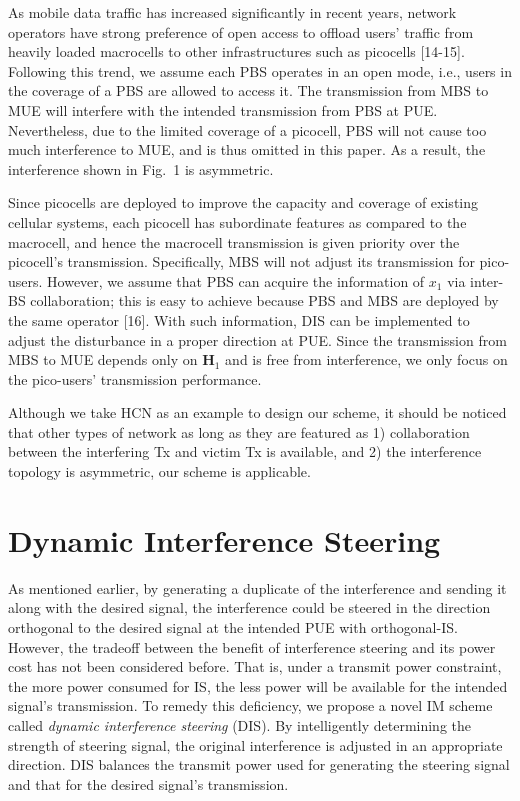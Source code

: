 \documentclass[10pt, conference, letterpaper]{IEEEtran}
\begin{document}
As mobile data traffic has increased significantly in recent years,
network operators have strong preference of open access to
offload users' traffic from heavily loaded macrocells to
other infrastructures such as picocells [14-15].
Following this trend, we assume each PBS operates in an open mode,
i.e., users in the coverage of a PBS are allowed to access it.
The transmission from MBS to MUE will interfere with
the intended transmission from PBS at PUE.
Nevertheless, due to the limited coverage of a picocell,
PBS will not cause too much interference to MUE,
and is thus omitted in this paper. As a result,
the interference shown in Fig.~1 is asymmetric.

Since picocells are deployed to improve the capacity and
coverage of existing cellular systems,
each picocell has subordinate features as compared to the macrocell,
and hence the macrocell transmission is given priority over the picocell's transmission.
Specifically, MBS will not adjust its transmission for pico-users.
However,
we assume that PBS can acquire the information of $x_{1}$ via inter-BS collaboration;
this is easy to achieve because PBS and MBS are deployed by the same operator [16].
With such information, DIS can be implemented to adjust the disturbance in a proper direction at PUE.
Since the transmission from MBS to MUE depends only on $\mathbf{H}_{1}$ and
is free from interference, we only focus on the pico-users' transmission performance.

Although we take HCN as an example to design our scheme,
it should be noticed that other types of network as long as they are featured as
1) collaboration between the interfering Tx and victim Tx is available,
and 2) the interference topology is asymmetric, our scheme is applicable.

\section{Dynamic Interference Steering}

As mentioned earlier, by generating a duplicate of the interference
and sending it along with the desired signal,
the interference could be steered in the direction orthogonal
to the desired signal at the intended PUE with orthogonal-IS.
However, the tradeoff between the benefit of interference steering
and its power cost has not been considered before.
That is, under a transmit power constraint, the more power consumed for IS,
the less power will be available for the intended signal's transmission.
To remedy this deficiency, we propose a novel IM scheme called \textit{dynamic interference steering} (DIS).
By intelligently determining the strength of steering signal,
the original interference is adjusted in an appropriate direction.
DIS balances the transmit power used for generating the steering signal
and that for the desired signal's transmission.
\end{document}
